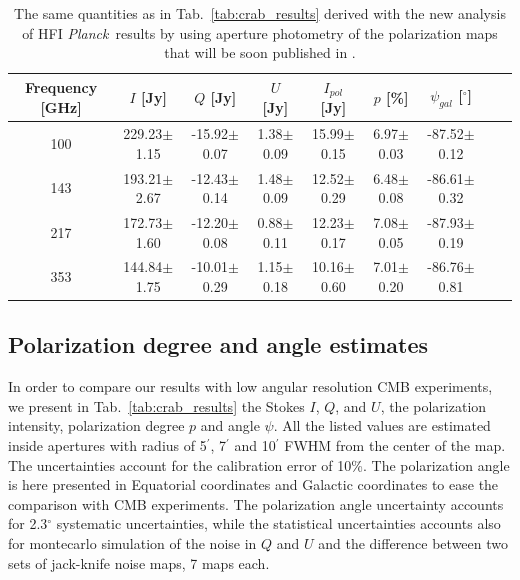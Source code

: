 \documentclass[twocolumn,traditabstract]{aa}
\def\Planck{\textit{Planck}}
\begin{document}
 \begin{table}[h!]
  \centering
      \begin{tabular}{ccccccccc}
      \hline
      \hline
       Frequency [GHz] & \small $I$ [Jy] & \small $Q$ [Jy] & \small $U$ [Jy] & \small $I_{pol}$ [Jy] & \small $p$ [\%] & \small $\psi_{gal}$ [$^\circ$] \\
      \hline

\small 100 & \small 229.23$\pm$1.15  & \small -15.92$\pm$0.07 & \small 1.38$\pm$0.09 & \small 15.99$\pm$0.15 & \small 6.97$\pm$0.03 & \small -87.52$\pm$0.12  \\ 
\small 143 & \small 193.21$\pm$2.67  & \small -12.43$\pm$0.14 & \small 1.48$\pm$0.09 & \small 12.52$\pm$0.29 & \small 6.48$\pm$0.08 & \small -86.61$\pm$0.32  \\
\small 217 & \small 172.73$\pm$1.60  & \small -12.20$\pm$0.08 & \small 0.88$\pm$0.11 & \small 12.23$\pm$0.17 & \small 
7.08$\pm$0.05 & \small -87.93$\pm$0.19  \\
\small 353 & \small 144.84$\pm$1.75  & \small -10.01$\pm$0.29 & \small 1.15$\pm$0.18 & \small 10.16$\pm$0.60 & \small 7.01$\pm$0.20 & \small -86.76$\pm$0.81 \\
    \hline            
    \hline   
    \end{tabular}
      \caption{The same quantities as in Tab.~\ref{tab:crab_results} derived with the new analysis of HFI \Planck\ results by using aperture photometry of the polarization maps that will be soon published in \cite{planck2018}.}
    \label{tab:planck_results}
 \end{table}

\subsection{Polarization degree and angle estimates}
In order to compare our results with low angular resolution CMB experiments, we present in Tab.~\ref{tab:crab_results} the Stokes $I$, $Q$, and $U$, the polarization intensity, polarization degree $p$ and angle $\psi$. All the listed values are estimated inside apertures with radius of 5$^\prime$, 7$^\prime$ and 10$^\prime$ FWHM from the center of the map. The uncertainties account for the calibration error of 10\%. 
The polarization angle is here presented in Equatorial coordinates and Galactic coordinates to ease the comparison with CMB experiments.
The polarization angle uncertainty accounts for 2.3$^{\circ}$ systematic uncertainties, while the statistical uncertainties accounts also for montecarlo simulation of the noise in $Q$ and $U$ and the difference between two sets of jack-knife noise maps, 7 maps each.
\end{document}
